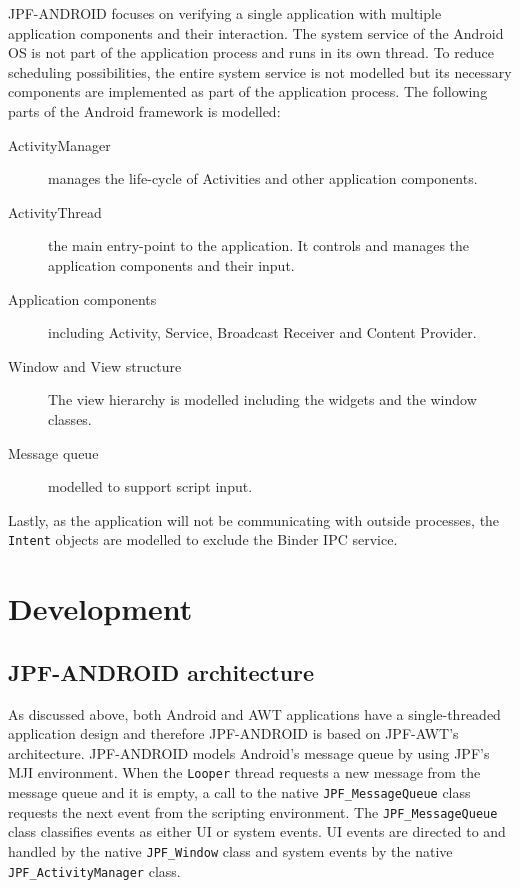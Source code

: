 \documentclass{acm_proc_article-sp}
\begin{document}
JPF-ANDROID focuses on verifying a single application with multiple application components and their interaction. The system service of
the Android OS is not part of the application process and runs in its own thread. To reduce scheduling possibilities, the entire system
service is not modelled but its necessary components are implemented as part of the application process. The following parts of the Android
framework is modelled:
\vspace{-10pt}
\begin{description}
 \item [ActivityManager]  manages the life-cycle of Activities and other application components.
 \item [ActivityThread]   the main entry-point to the application. It controls and manages the application components and their input.
 \item [Application components] including Activity, Service, \linebreak Broadcast Receiver and Content Provider. 
 \item [Window and View structure] The view hierarchy is modelled including the widgets and the window classes.
 \item [Message queue] modelled to support script input.
\end{description}
\vspace{-5pt}
Lastly, as the application will not be communicating with outside processes, the \texttt{Intent} objects are modelled to exclude the
Binder IPC service.

\section{Development}
\subsection{JPF-ANDROID architecture}
As discussed above, both Android and AWT applications have a single-threaded application design and therefore JPF-ANDROID is based on JPF-AWT's architecture.
\linebreak JPF-ANDROID models Android's message queue by using JPF's MJI
environment. When the \texttt{Looper} thread requests a new message from the message queue and it is empty, a call to the native
\texttt{JPF\_MessageQueue} class requests the next event from the scripting environment. The \texttt{JPF\_MessageQueue} class classifies
events as either UI or system events. UI events are directed to and handled by the native \texttt{JPF\_Window} class and system events by
the native \texttt{JPF\_ActivityManager} class.
\end{document}
